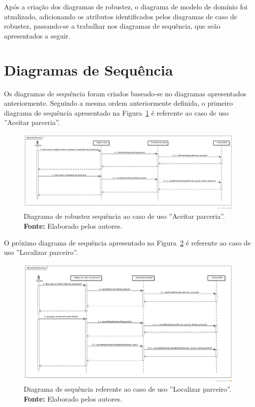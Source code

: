 Após a criação dos diagramas de robustez, o diagrama de modelo de domínio foi atualizado, adicionando os atributos identificados pelos diagramas de caso de robustez, passando-se a trabalhar nos diagramas de sequência, que seão apresentados a seguir.

\section*{Diagramas de Sequência}

Os diagramas de sequência foram criados baseado-se no diagramas apresentados anteriormente. Seguindo a mesma ordem anteriormente definida, o primeiro diagrama de sequência apresentado na Figura~\ref{fig:ap1:diagrama_sequencia_aceitar_parceria} é referente ao caso de uso ''Aceitar parceria''.

\newpage
\captionsetup[figure]{list=no}
\begin{figure}[h!]
	\centerline{\includegraphics[angle=90,scale=0.45]{./imagens/apendices/diagrama-sequencia-aceitar-parceria.png}}
	\caption[Diagrama de sequência referente ao caso de uso ''Aceitar parceria''.]
	{Diagrama de robustez sequência ao caso de uso ''Aceitar parceria''. \textbf{Fonte:} Elaborado pelos autores.}
	\label{fig:ap1:diagrama_sequencia_aceitar_parceria}
\end{figure}


O próximo diagrama de sequência apresentado na Figura~\ref{fig:ap1:diagrama_sequencia_localizar_parceiro} é referente ao caso de uso ''Localizar parceiro''.

\captionsetup[figure]{list=no}
\begin{figure}[h!]
	\centerline{\includegraphics[angle=90,scale=0.45]{./imagens/apendices/diagrama-sequencia-localizar-parceiros.png}}
	\caption[Diagrama de sequência referente ao caso de uso ''Localizar parceiro''.]
	{Diagrama de sequência referente ao caso de uso ''Localizar parceiro''. \textbf{Fonte:} Elaborado pelos autores.}
	\label{fig:ap1:diagrama_sequencia_localizar_parceiro}
\end{figure}

